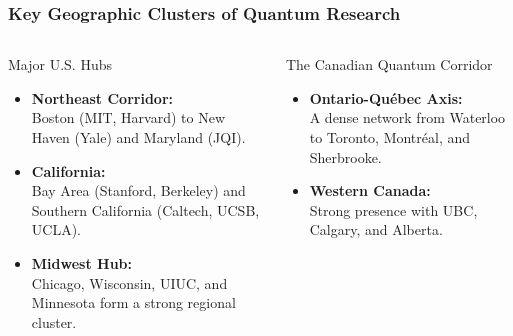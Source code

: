\documentclass[aspectratio=169]{beamer}
\begin{document}
\begin{frame}
    \frametitle{Key Geographic Clusters of Quantum Research}
    
    \begin{columns}[T]
        \begin{column}{0.5\textwidth}
            \begin{block}{Major U.S. Hubs}
                \begin{itemize}
                    \item \textbf{Northeast Corridor:} \\ Boston (MIT, Harvard) to New Haven (Yale) and Maryland (JQI).
                    \vspace{1em}
                    \item \textbf{California:} \\ Bay Area (Stanford, Berkeley) and Southern California (Caltech, UCSB, UCLA).
                    \vspace{1em}
                    \item \textbf{Midwest Hub:} \\ Chicago, Wisconsin, UIUC, and Minnesota form a strong regional cluster.
                \end{itemize}
            \end{block}
        \end{column}
        \begin{column}{0.5\textwidth}
            \begin{block}{The Canadian Quantum Corridor}
                \begin{itemize}
                    \item \textbf{Ontario-Québec Axis:} \\ A dense network from Waterloo to Toronto, Montréal, and Sherbrooke.
                    \vspace{1em}
                    \item \textbf{Western Canada:} \\ Strong presence with UBC, Calgary, and Alberta.
                \end{itemize}
            \end{block}
        \end{column}
    \end{columns}
\end{frame}
\end{document}
